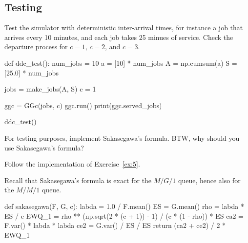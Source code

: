 \subsection{Testing}
\label{sec:testing-1}

\begin{exercise}
Test the simulator with deterministic inter-arrival times, for instance a job that arrives every 10 minutes, and each job takes 25 minues of service. Check the departure process for $c=1$, $c=2$, and $c=3$. 
\begin{solution}
\begin{pyverbatim}
def ddc_test():
    num_jobs = 10
    a = [10] * num_jobs
    A = np.cumsum(a)
    S = [25.0] * num_jobs

    jobs = make_jobs(A, S)
    c = 1

    ggc = GGc(jobs, c)
    ggc.run()
    print(ggc.served_jobs)


ddc_test()
\end{pyverbatim}
\end{solution}

\end{exercise}

\begin{exercise}
  For testing purposes, implement Sakasegawa's formula.  BTW, why should you use Sakasegawa's formula?

\begin{hint}
Follow the implementation of Exercise~\ref{ex:5}.

\end{hint}

\begin{solution}
Recall that Sakasegawa's formula is exact for the $M/G/1$ queue, hence also for the $M/M/1$ queue.

\begin{pyverbatim}
def sakasegawa(F, G, c):
    labda = 1.0 / F.mean()
    ES = G.mean()
    rho = labda * ES / c
    EWQ_1 = rho ** (np.sqrt(2 * (c + 1)) - 1) / (c * (1 - rho)) * ES
    ca2 = F.var() * labda * labda
    ce2 = G.var() / ES / ES
    return (ca2 + ce2) / 2 * EWQ_1

\end{pyverbatim}
\end{solution}
\end{exercise}


